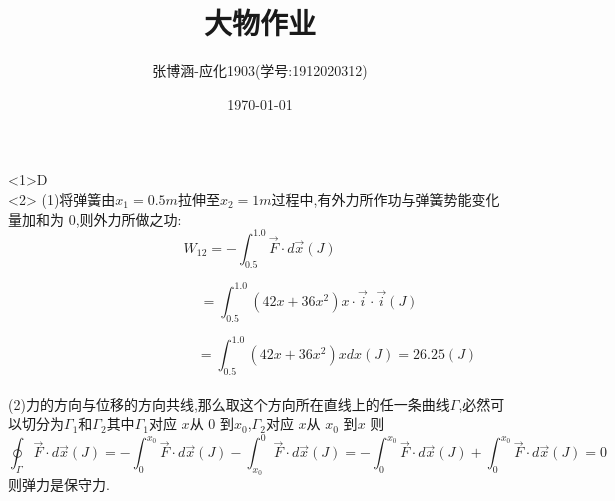 \documentclass{article}
\title{大物作业}
\author{张博涵-应化1903(学号:1912020312)}
\date{\today}
\begin{document}
	\maketitle
	
	<1>\quad D \\
	
	<2>
	(1)将弹簧由$x_1=0.5m$拉伸至$x_2=1m$过程中,有外力所作功与弹簧势能变化量加和为 0,则外力所做之功:
	$$W_{12}=-\int _ {0.5} ^ {1.0}\vec{F} \cdot d\vec{x}(J)$$
	
	
	
	$$ \quad \quad \quad \quad \quad \quad \quad =\int _ {0.5} ^ {1.0}(42x+36x^2)x\cdot \vec{i}\cdot \vec{i} (J)$$
	
	
	
	$$ \quad \quad \quad \quad\quad \quad \quad \quad \quad \quad \quad =\int _ {0.5} ^ {1.0}(42x+36x^2)x dx(J)=26.25(J)$$\\
	(2)力的方向与位移的方向共线,那么取这个方向所在直线上的任一条曲线$\Gamma$,必然可以切分为$\Gamma_1$和$\Gamma_2$其中$\Gamma_1$对应 $x$从 $0$ 到$x_0$,$\Gamma_2$对应 $x$从 $x_0$ 到$x$
	则$$\oint_{\Gamma}\vec{F} \cdot d\vec{x}(J)= 
	-\int _ {0} ^ {x_0}\vec{F} \cdot d\vec{x}(J)-\int _ {x_0} ^ {0}\vec{F} \cdot d\vec{x}(J)=-\int _ {0} ^ {x_0}\vec{F} \cdot d\vec{x}(J)+\int _ {0} ^ {x_0}\vec{F} \cdot d\vec{x}(J)=0$$
	则弹力是保守力.

	
	
	
\end{document}
